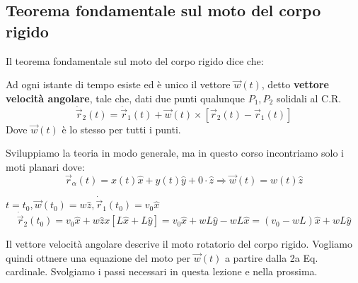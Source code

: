 \subsection{Teorema fondamentale sul moto del corpo rigido}
Il teorema fondamentale sul moto del corpo rigido dice che:
\begin{theorem}
    Ad ogni istante di tempo esiste ed è unico il vettore $\vec{w}(t)$, detto \textbf{vettore velocità angolare}, tale che, dati due punti qualunque $P_1, P_2$
    solidali al C.R.
    $$\dot{\vec{r}}_2(t) = \dot{\vec{r}}_1(t) + \vec{w}(t) \times [\vec{r}_2(t) - \vec{r}_1(t)]$$
    Dove $\vec{w}(t)$ è lo stesso per tutti i punti.
\end{theorem}
\hspace{-15pt}Sviluppiamo la teoria in modo generale, ma in questo corso incontriamo solo i moti planari dove:
$$\vec{r}_{\alpha}(t) = x(t) \hat{x} + y(t)\hat{y} + 0 \cdot \hat{z} \Rightarrow \vec{w}(t) = w(t) \hat{z}$$
\begin{example}
    $t= t_0, \vec{w}(t_0) = w\hat{z}, \dot{\vec{r}}_1(t_0) = v_0\hat{x}$
    $$\dot{\vec{r}}_2(t_0) = v_0\hat{x} + w\hat{z}x[L\hat{x}+ L\hat{y}] = v_0\hat{x} + wL\hat{y} - wL\hat{x} = (v_0 - wL)\hat{x} + wL\hat{y}$$
\end{example}
\begin{observation}
    Il vettore velocità angolare descrive il moto rotatorio del corpo rigido. Vogliamo quindi ottnere una equazione del moto per $\vec{w}(t)$ a partire dalla 2a Eq. 
    cardinale. Svolgiamo i passi necessari in questa lezione e nella prossima.
\end{observation}

